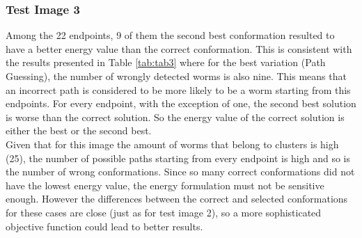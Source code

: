 \subsubsection*{Test Image 3}

Among the 22 endpoints, 9
of them the second best conformation resulted to have a better energy value
than the correct conformation. This is consistent with the results presented
in Table \ref{tab:tab3} where for the best variation (Path Guessing), the
number of wrongly detected worms is also nine. This means that an incorrect 
path is considered to be more likely to be a worm starting from this
endpoints. For every endpoint, with the exception of one, the second best 
solution is worse than the correct solution. So the energy value of the 
correct solution is either the best or the second best.\\

Given that for this image the amount of worms that belong to clusters
is high (25), the number of possible paths starting
from every endpoint is high and so is the number of wrong conformations.
Since so many correct conformations did not have the lowest energy value,
the energy formulation must not be sensitive enough. However
the differences between the correct and selected conformations for
these cases are close (just as for test image 2), so a more sophisticated objective function could lead
to better results.\\



